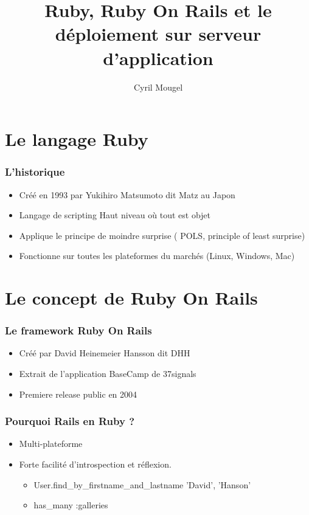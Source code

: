 \documentclass{beamer}
\title{Ruby, Ruby On Rails et le déploiement sur serveur d'application}
\author{Cyril Mougel}
\begin{document}
\begin{frame}
    \titlepage
\end{frame}

\section{Le langage Ruby}

\begin{frame}
	\frametitle{L'historique}
	\begin{itemize}
		\item Créé en 1993 par Yukihiro Matsumoto dit \og{}Matz\fg{} au Japon
		\item Langage de scripting Haut niveau où tout est objet
        \item Applique le principe de moindre surprise ( POLS, principle of
                least surprise)
        \item Fonctionne sur toutes les plateformes du marchés (Linux, Windows,
                Mac)
	\end{itemize}
\end{frame}

\section{Le concept de Ruby On Rails}


\begin{frame}
    \frametitle{Le framework Ruby On Rails}
    \begin{itemize}
        \item Créé par David Heinemeier Hansson dit \og{}DHH\fg{}
        \item Extrait de l'application BaseCamp de 37signals
        \item Premiere release public en 2004 
    \end{itemize}
\end{frame}

\begin{frame}
    \frametitle{Pourquoi Rails en Ruby ?}
    \begin{itemize}
        \item Multi-plateforme
        \item Forte facilité d'introspection et réflexion.
            \begin{itemize}
                \item User.find\_by\_firstname\_and\_lastname 'David', 'Hanson'
                \item has\_many :galleries
            \end{itemize}
    \end{itemize}
\end{frame}
\end{document}
